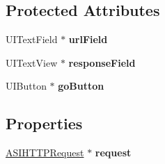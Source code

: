 \subsection*{\-Protected \-Attributes}
\begin{DoxyCompactItemize}
\item 
\hypertarget{interface_synchronous_view_controller_afc1c8b32244bc68aefc481c7aaddf97e}{
\-U\-I\-Text\-Field $\ast$ {\bfseries url\-Field}}
\label{interface_synchronous_view_controller_afc1c8b32244bc68aefc481c7aaddf97e}

\item 
\hypertarget{interface_synchronous_view_controller_ace701de5b1f34aa619d13d02e8f6ebc6}{
\-U\-I\-Text\-View $\ast$ {\bfseries response\-Field}}
\label{interface_synchronous_view_controller_ace701de5b1f34aa619d13d02e8f6ebc6}

\item 
\hypertarget{interface_synchronous_view_controller_af76b7a46f85d0f5f939bb6623f2087d4}{
\-U\-I\-Button $\ast$ {\bfseries go\-Button}}
\label{interface_synchronous_view_controller_af76b7a46f85d0f5f939bb6623f2087d4}

\end{DoxyCompactItemize}
\subsection*{\-Properties}
\begin{DoxyCompactItemize}
\item 
\hypertarget{interface_synchronous_view_controller_acb2a5e4340be498088ecca913fa3dc6a}{
\hyperlink{interface_a_s_i_h_t_t_p_request}{\-A\-S\-I\-H\-T\-T\-P\-Request} $\ast$ {\bfseries request}}
\label{interface_synchronous_view_controller_acb2a5e4340be498088ecca913fa3dc6a}

\end{DoxyCompactItemize}


